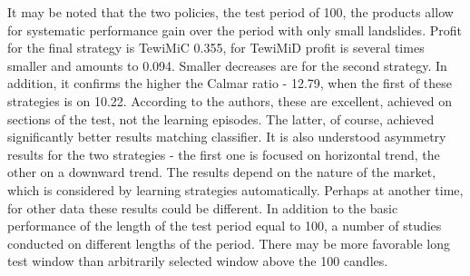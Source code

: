 \documentclass{tewiart}
\begin{document}
It may be noted that the two policies, the test period of 100, the products allow for systematic performance gain over the period with
 only small landslides. Profit for the final strategy is TewiMiC 0.355, for TewiMiD profit is several times smaller and amounts to 0.094. 
Smaller decreases are for the second strategy. In addition, it confirms the higher the Calmar ratio - 12.79, 
when the first of these strategies is on 10.22.
According to the authors, these are excellent, achieved on sections of the test, not the learning episodes.
 The latter, of course, achieved significantly better results matching classifier. It is also understood asymmetry results for the two strategies
 - the first one is focused on horizontal trend, the other on a downward trend. The results depend on the nature of the market, 
which is considered by learning strategies automatically. Perhaps at another time, for other data these results could be different.
In addition to the basic performance of the length of the test period equal to 100, a number of studies conducted on different lengths
 of the period. There may be more favorable long test window than arbitrarily selected window above the 100 candles.\\
\end{document}
